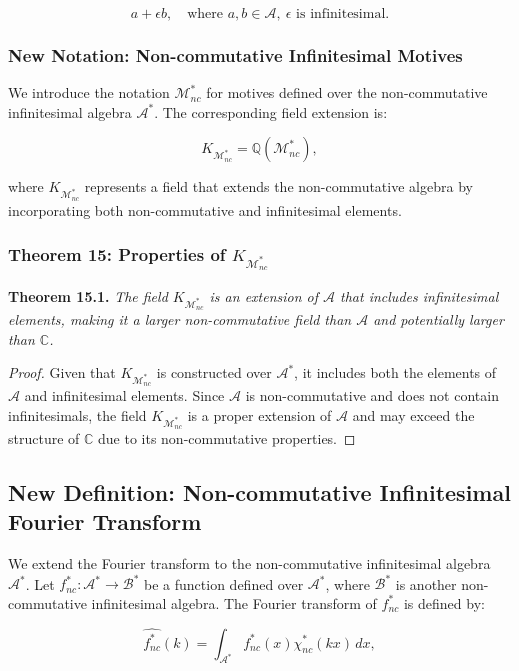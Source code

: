 \documentclass{article}
\begin{document}
\[
a + \epsilon b, \quad \text{where } a, b \in \mathcal{A}, \ \epsilon \text{ is infinitesimal}.
\]

\subsubsection{New Notation: Non-commutative Infinitesimal Motives}
We introduce the notation \(\mathcal{M}_{nc}^*\) for motives defined over the non-commutative infinitesimal algebra \(\mathcal{A}^*\). The corresponding field extension is:

\[
K_{\mathcal{M}_{nc}^*} = \mathbb{Q}(\mathcal{M}_{nc}^*),
\]

where \(K_{\mathcal{M}_{nc}^*}\) represents a field that extends the non-commutative algebra by incorporating both non-commutative and infinitesimal elements.

\subsubsection{Theorem 15: Properties of \(K_{\mathcal{M}_{nc}^*}\)}
\textbf{Theorem 15.1.} \textit{The field \(K_{\mathcal{M}_{nc}^*}\) is an extension of \(\mathcal{A}\) that includes infinitesimal elements, making it a larger non-commutative field than \(\mathcal{A}\) and potentially larger than \(\mathbb{C}\).}

\begin{proof}
Given that \(K_{\mathcal{M}_{nc}^*}\) is constructed over \(\mathcal{A}^*\), it includes both the elements of \(\mathcal{A}\) and infinitesimal elements. Since \(\mathcal{A}\) is non-commutative and does not contain infinitesimals, the field \(K_{\mathcal{M}_{nc}^*}\) is a proper extension of \(\mathcal{A}\) and may exceed the structure of \(\mathbb{C}\) due to its non-commutative properties.
\end{proof}

\subsection{New Definition: Non-commutative Infinitesimal Fourier Transform}
We extend the Fourier transform to the non-commutative infinitesimal algebra \(\mathcal{A}^*\). Let \(f_{nc}^*: \mathcal{A}^* \to \mathcal{B}^*\) be a function defined over \(\mathcal{A}^*\), where \(\mathcal{B}^*\) is another non-commutative infinitesimal algebra. The Fourier transform of \(f_{nc}^*\) is defined by:

\[
\widehat{f_{nc}^*}(k) = \int_{\mathcal{A}^*} f_{nc}^*(x) \chi_{nc}^*(kx) \, dx,
\]
\end{document}
